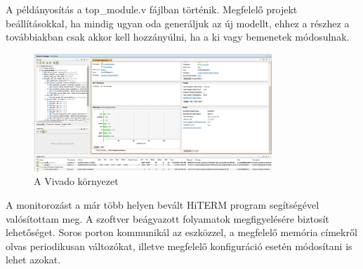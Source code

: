 A példányosítás a top\_module.v fájlban történik. Megfelelő projekt beállításokkal, ha mindig ugyan oda generáljuk az új modellt, ehhez a részhez a továbbiakban csak akkor kell hozzányúlni, ha a ki vagy bemenetek módosulnak.

\begin{figure}[H]
	\centering
	\includegraphics[width = 0.8\textwidth]{figures/vivado.png}
	\caption{A Vivado környezet} 
	\label{fig:hdl_report}
\end{figure}

A monitorozást a már több helyen bevált HiTERM program segítségével valósítottam meg. A szoftver beágyazott folyamatok megfigyelésére biztosít lehetőséget. Soros porton kommunikál az eszközzel, a megfelelő memória címekről olvas periodikusan változókat, illetve megfelelő konfiguráció esetén módosítani is lehet azokat.